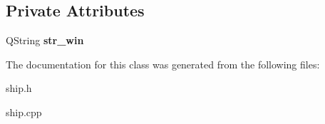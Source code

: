 \subsection*{Private Attributes}
\begin{DoxyCompactItemize}
\item 
\hypertarget{classship_abd81a1e65e3a5eb6bff09c804b418187}{Q\-String {\bfseries str\-\_\-win}}\label{classship_abd81a1e65e3a5eb6bff09c804b418187}

\end{DoxyCompactItemize}


The documentation for this class was generated from the following files\-:\begin{DoxyCompactItemize}
\item 
ship.\-h\item 
ship.\-cpp\end{DoxyCompactItemize}
